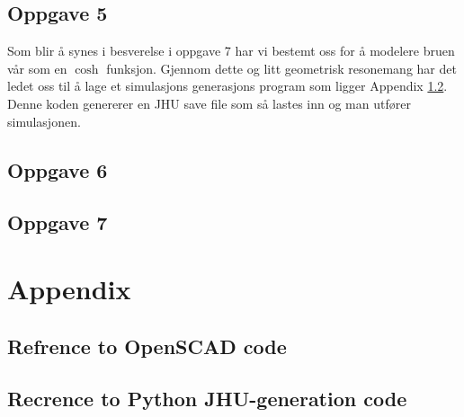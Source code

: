 \documentclass{report}
\begin{document}
\section*{Oppgave 5}

Som blir å synes i besverelse i oppgave 7 har vi bestemt oss for å modelere bruen vår som en $\cosh$ funksjon. Gjennom dette og litt geometrisk resonemang har det ledet oss til å lage et simulasjons generasjons program som ligger Appendix \ref{sec:jhu-gen}. Denne koden genererer en JHU save file som så lastes inn og man utfører simulasjonen.

\section*{Oppgave 6}

\section*{Oppgave 7}

\chapter{Appendix}

\section{Refrence to OpenSCAD code}



\section{Recrence to Python JHU-generation code}
\label{sec:jhu-gen}



\listoffigures
\end{document}
